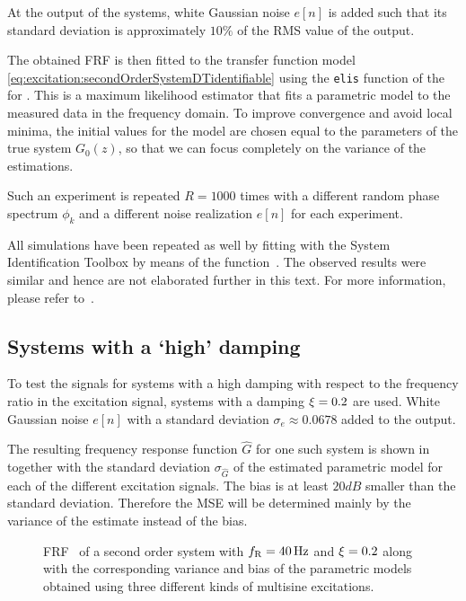  At the output of the systems, white Gaussian noise $e[n]$ is added such that its standard deviation is approximately $10\%$ of the RMS value of the output.

  
  The obtained FRF is then fitted to the transfer function model \eqref{eq:excitation:secondOrderSystemDTidentifiable} using the \texttt{elis} function of the \FDIDENT~\citep{FDIDENT} for \MATLAB.
  This is a maximum likelihood estimator that fits a parametric model to the measured data in the frequency domain.
  To improve convergence and avoid local minima, the initial values for the model are chosen equal to the parameters of the true system $G_0(z)$, so that we can focus completely on the variance of the estimations.

  Such an experiment is repeated $R=1000$ times with a different random phase  spectrum $\phi_k$ and a different noise realization $e[n]$ for each experiment.

  \begin{remark}
  All simulations  have been repeated as well by fitting with the \MATLAB System Identification Toolbox by means of the  function~\citep{TDIDENT}.
  The observed results were similar and hence are not elaborated further in this text.
  For more information, please refer to~\citep{Larsson2012SYSID}.
  \end{remark}

  \subsection{Systems with a `high' damping}
  To test the signals for systems with a high damping with respect to the frequency ratio in the excitation signal, systems with a damping $\xi_{} = 0.2$ are used.
  White Gaussian noise $e[n]$ with a standard deviation $\sigma_e \approx 0.0678$ added to the output.

  The resulting frequency response function $\hat{G}$ for one such system is shown in  together with the standard deviation $\sigma_{\hat{G}}$ of the estimated parametric model for each of the different excitation signals.
  The bias is at least $20\unit{dB}$ smaller than the standard  deviation.
  Therefore the \gls{MSE} will be determined mainly by the variance of the estimate instead of the bias.

  \begin{figure}[th]
    \centering
      \setlength{}
      \setlength\figureheight{0.68\figurewidth}
    
    \caption[Simulated  of a single system using different excitation signals.]{\gls{FRF}~ of a second order system with $f_{\mathrm{R}}=40\,\mathrm{Hz}$ and $\xi_{}=0.2$ along with the corresponding variance and bias of the parametric models obtained using three different kinds of multisine excitations.}%
    \label{fig:excitation:FRF1}
  \end{figure}

